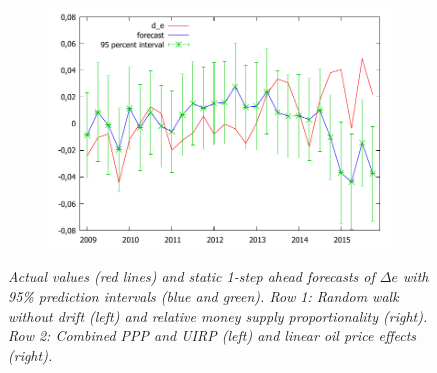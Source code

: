 \documentclass[10pt]{article}
\numberwithin{equation}{section}
\numberwithin{table}{section}
\numberwithin{figure}{section}
\begin{document}
\begin{spacing}{1.5}
\begin{figure}[h!]
\begin{subfigure}{.5\textwidth}
  \label{fig:sfig3}
\end{subfigure}
\begin{subfigure}{.5\textwidth}
  \centering
  \includegraphics[width=\linewidth]{images/AkramForecast.pdf}
  \label{fig:sfig4}
\end{subfigure}
\vspace*{-0,5cm}\caption{\textit{\small Actual values (red lines) and static 1-step ahead forecasts of $\Delta e$ with 95\% prediction intervals (blue and green). Row 1: Random walk without drift (left) and relative money supply proportionality (right). Row 2: Combined PPP and UIRP (left) and linear oil price effects (right).}}
\label{fig:fig}
\end{figure}


\end{spacing}
\end{document}
